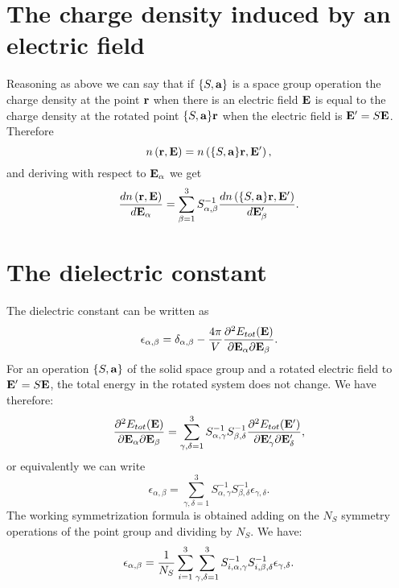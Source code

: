 \documentclass[12pt,a4paper,twoside]{report}
\begin{document}
\section{The charge density induced by an electric field}
Reasoning as above we can say that if $\{S,{\bf a}\}$ is a space group operation the charge density
at the point ${\bf r}$ when there is an electric field ${\bf E}$ is equal to the charge density at the rotated point  $\{S,{\bf a}\}{\bf r}$ when the electric field
is ${\bf E}'=S {\bf E}$. Therefore
\begin{equation}
n\left({\bf r}, {\bf E}\right)
=n\left(\{S,{\bf a}\} {\bf r}, {\bf E}'\right), 
\end{equation}
and deriving with respect to ${\bf E}_\alpha$ we get
\begin{equation}
{d n\left({\bf r}, {\bf E}\right)
\over d {\bf E}_\alpha }=\sum_{\beta=1}^3 S^{-1}_{\alpha,\beta} {d n\left(\{S,{\bf a}\} {\bf r}, {\bf E}'\right)
\over d {\bf E}'_\beta }.
\end{equation}

\section{The dielectric constant}
The dielectric constant can be written as 
\begin{equation}
\epsilon_{\alpha,\beta}=\delta_{\alpha,\beta} -{4 \pi
\over V} {\partial^2 E_{tot} ({\bf E}) \over \partial {\bf E}_\alpha \partial {\bf E}_\beta}.
\end{equation}
For an operation $\{S,{\bf a}\}$ of the solid space group and a rotated electric field to ${\bf E}'=S{\bf E}$, the total energy in the rotated system does not change. We have therefore:
\begin{equation}
{\partial^2 E_{tot} ({\bf E}) \over \partial {\bf E}_\alpha \partial {\bf E}_\beta}=\sum_{\gamma,\delta=1}^3
S^{-1}_{\alpha,\gamma} S^{-1}_{\beta,\delta}
{\partial^2 E_{tot} ({\bf E}') \over \partial {\bf E}'_\gamma \partial {\bf E}'_\delta},
\end{equation}
or equivalently we can write
\begin{equation}
\epsilon_{\alpha,\beta}=\sum_{\gamma,\delta=1}^3
S^{-1}_{\alpha,\gamma} S^{-1}_{\beta,\delta}
\epsilon_{\gamma,\delta}.
\end{equation}
The working symmetrization formula is obtained adding on the $N_S$ symmetry operations of the point group
and dividing by $N_S$. We have:
\begin{equation}
\epsilon_{\alpha,\beta}= {1 \over N_S} \sum_{i=1}^3
\sum_{\gamma,\delta=1}^3 S^{-1}_{i,\alpha,\gamma}
S^{-1}_{i,\beta,\delta}
\epsilon_{\gamma,\delta}.
\label{symepsilon}
\end{equation}
\end{document}
